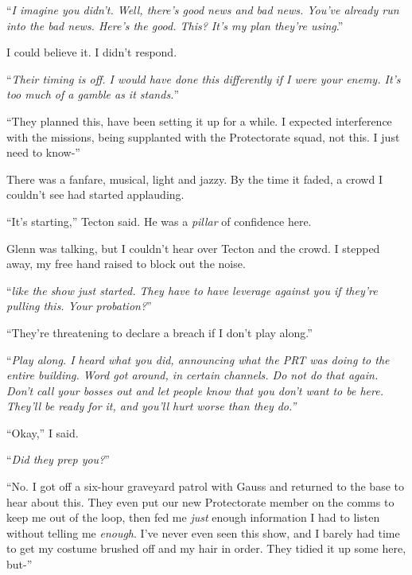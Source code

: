``\emph{I imagine you didn't.  Well, there's good news and bad news.  You've already run into the bad news.  Here's the good.  This?  It's my plan they're using}.''



I could believe it.  I didn't respond.



``\emph{Their timing is off.  I would have done this differently if I were your enemy.  It's too much of a gamble as it stands.}''



``They planned this, have been setting it up for a while.  I expected interference with the missions, being supplanted with the Protectorate squad, not this.  I just need to know-''



There was a fanfare, musical, light and jazzy.  By the time it faded, a crowd I couldn't see had started applauding.



``It's starting,'' Tecton said.  He was a \emph{pillar} of confidence here.



Glenn was talking, but I couldn't hear over Tecton and the crowd.  I stepped away, my free hand raised to block out the noise.



``\emph{\ldotsnds like the show just started.  They have to have leverage against you if they're pulling this.  Your probation?}''



``They're threatening to declare a breach if I don't play along.''



``\emph{Play along.  I heard what you did, announcing what the PRT was doing to the entire building.  Word got around, in certain channels.  Do not do that again.  Don't call your bosses out and let people know that you don't want to be here.  They'll be ready for it, and you'll hurt worse than they do.''}



``Okay,'' I said.



``\emph{Did they prep you?}''



``No.   I got off a six-hour graveyard patrol with Gauss and returned to the base to hear about this.  They even put our new Protectorate member on the comms to keep me out of the loop, then fed me \emph{just} enough information I had to listen without telling me \emph{enough}.  I've never even seen this show, and I barely had time to get my costume brushed off and my hair in order.  They tidied it up some here, but-''



